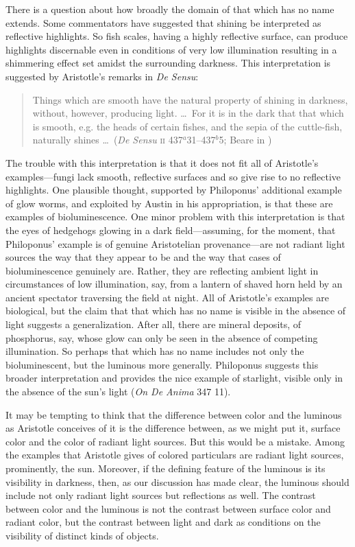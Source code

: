 There is a question about how broadly the domain of that which has no name extends. Some commentators have suggested that shining be interpreted as reflective highlights. So fish scales, having a highly reflective surface, can produce highlights discernable even in conditions of very low illumination resulting in a shimmering effect set amidst the surrounding darkness. This interpretation is suggested by Aristotle's remarks in \emph{De Sensu}: 
\begin{quote}
	Things which are smooth have the natural property of shining in darkness, without, however, producing light. \ldots\ For it is in the dark that that which is smooth, e.g. the heads of certain fishes, and the sepia of the cuttle-fish, naturally shines \ldots\ (\emph{De Sensu} \textsc{ii} 437\( ^{a} \)31--437\( ^{b} \)5; Beare in \citealt[4]{Barnes:1984uq})
\end{quote}
The trouble with this interpretation is that it does not fit all of Aristotle's examples---fungi lack smooth, reflective surfaces and so give rise to no reflective highlights. One plausible thought, supported by Philoponus' additional example of glow worms, and exploited by Austin in his appropriation, is that these are examples of bioluminescence. One minor problem with this interpretation is that the eyes of hedgehogs glowing in a dark field---assuming, for the moment, that Philoponus' example is of genuine Aristotelian provenance---are not radiant light sources the way that they appear to be and the way that cases of  bioluminescence genuinely are. Rather, they are reflecting ambient light in circumstances of low illumination, say, from a lantern of shaved horn held by an ancient spectator traversing the field at night. All of Aristotle's examples are biological, but the claim that that which has no name is visible in the absence of light suggests a generalization. After all, there are mineral deposits, of phosphorus, say, whose glow can only be seen in the absence of competing illumination. So perhaps that which has no name includes not only the bioluminescent, but the luminous more generally. Philoponus suggests this broader interpretation and provides the nice example of starlight, visible only in the absence of the sun's light (\emph{On \emph{De Anima}} 347 11). 

It may be tempting to think that the difference between color and the luminous as Aristotle conceives of it is the difference between, as we might put it, surface color and the color of radiant light sources. But this would be a mistake. Among the examples that Aristotle gives of colored particulars are radiant light sources, prominently, the sun. Moreover, if the defining feature of the luminous is its visibility in darkness, then, as our discussion has made clear, the luminous should include not only radiant light sources but reflections as well. The contrast between color and the luminous is not the contrast between surface color and radiant color, but the contrast between light and dark as conditions on the visibility of distinct kinds of objects.

